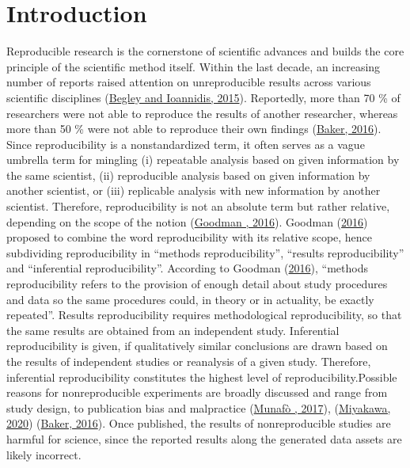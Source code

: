 \documentclass[letterpaper,12pt,english]{jupyterBook}
\begin{document}
\sphinxstepscope


\chapter{Introduction}
\label{\detokenize{introduction:introduction}}\label{\detokenize{introduction::doc}}
\sphinxAtStartPar
Reproducible research is the cornerstone of scientific advances and builds the core principle of the scientific method itself. Within the last decade, an increasing number of reports raised attention on unreproducible results across various scientific disciplines (\hyperlink{cite.references:id33}{Begley and Ioannidis, 2015}). Reportedly, more than 70 \% of researchers were not able to reproduce the results of another researcher, whereas more than 50 \% were not able to reproduce their own findings (\hyperlink{cite.references:id32}{Baker, 2016}).
Since reproducibility is a non\sphinxhyphen{}standardized term, it often serves as a vague umbrella term for mingling (i) repeatable analysis based on given information by the same scientist, (ii) reproducible analysis based on given information by another scientist, or (iii) replicable analysis with new information by another scientist.
Therefore, reproducibility is not an absolute term but rather relative, depending on the scope of the notion (\hyperlink{cite.references:id31}{Goodman , 2016}). Goodman  (\hyperlink{cite.references:id31}{2016}) proposed to combine the word reproducibility with its relative scope, hence subdividing reproducibility in “methods reproducibility”, “results reproducibility” and “inferential reproducibility”. According to Goodman  (\hyperlink{cite.references:id31}{2016}), “methods reproducibility refers to the provision of enough detail about study procedures and data so the same procedures could, in theory or in actuality, be exactly repeated”. Results reproducibility requires methodological reproducibility, so that the same results are obtained from an independent study. Inferential reproducibility is given, if qualitatively similar conclusions are drawn based on the results of independent studies or reanalysis of a given study. Therefore, inferential reproducibility constitutes the highest level of reproducibility.Possible reasons for non\sphinxhyphen{}reproducible experiments are broadly discussed and range from study design, to publication bias and malpractice (\hyperlink{cite.references:id34}{Munafò , 2017}), (\hyperlink{cite.references:id21}{Miyakawa, 2020}) (\hyperlink{cite.references:id32}{Baker, 2016}). Once published, the results of non\sphinxhyphen{}reproducible studies are harmful for science, since the reported results along the generated data assets are likely incorrect.
\end{document}
